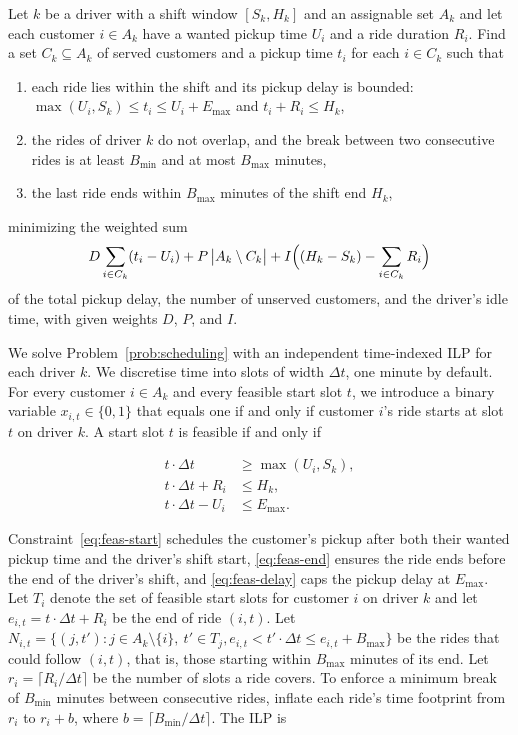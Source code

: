 \begin{problem}
\label{prob:scheduling}
Let $k$ be a driver with a shift window $[S_k, H_k]$ and an assignable set $A_k$ and let each customer $i \in A_k$ have a wanted pickup time $U_i$ and a ride duration $R_i$. Find a set $C_k \subseteq A_k$ of served customers and a pickup time $t_i$ for each $i \in C_k$ such that
\begin{enumerate}
  \item each ride lies within the shift and its pickup delay is bounded: $\max(U_i, S_k) \le t_i \le U_i + E_{\max}$ and $t_i + R_i \le H_k$,
  \item the rides of driver $k$ do not overlap, and the break between two consecutive rides is at least $B_{\min}$ and at most $B_{\max}$ minutes,
  \item the last ride ends within $B_{\max}$ minutes of the shift end $H_k$,
\end{enumerate}
minimizing the weighted sum
\[
D \sum_{i \in C_k} (t_i - U_i)
+ P\,\bigl|A_k \setminus C_k\bigr|
+ I \Bigl( (H_k - S_k) - \sum_{i \in C_k} R_i \Bigr)
\]
of the total pickup delay, the number of unserved customers, and the driver's idle time, with given weights $D$, $P$, and $I$.
\end{problem}

We solve Problem~\ref{prob:scheduling} with an independent time-indexed ILP for each driver $k$. We discretise time into slots of width $\Delta t$, one minute by default. For every customer $i \in A_k$ and every feasible start slot $t$, we introduce a binary variable $x_{i,t} \in \{0, 1\}$ that equals one if and only if customer $i$'s ride starts at slot $t$ on driver $k$. A start slot $t$ is feasible if and only if

\begin{align}
t \cdot \Delta t        &\geq \max(U_i, S_k), \label{eq:feas-start} \\
t \cdot \Delta t + R_i  &\leq H_k, \label{eq:feas-end} \\
t \cdot \Delta t - U_i  &\leq E_{\max}. \label{eq:feas-delay}
\end{align}

Constraint~\eqref{eq:feas-start} schedules the customer's pickup after both their wanted pickup time and the driver's shift start, \eqref{eq:feas-end} ensures the ride ends before the end of the driver's shift, and \eqref{eq:feas-delay} caps the pickup delay at $E_{\max}$. Let $T_i$ denote the set of feasible start slots for customer $i$ on driver $k$ and let $e_{i,t} = t \cdot \Delta t + R_i$ be the end of ride $(i,t)$. Let $N_{i,t} = \{(j, t') : j \in A_k \setminus \{i\},\ t' \in T_j, e_{i,t} < t' \cdot \Delta t \leq e_{i,t} + B_{\max}\}$ be the rides that could follow $(i,t)$, that is, those starting within $B_{\max}$ minutes of its end. Let $r_i = \lceil R_i / \Delta t \rceil$ be the number of slots a ride covers. To enforce a minimum break of $B_{\min}$ minutes between consecutive rides, inflate each ride's time footprint from $r_i$ to $r_i + b$, where $b = \lceil B_{\min} / \Delta t \rceil$. The ILP is

